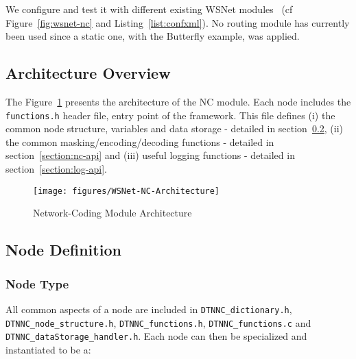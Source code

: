 \documentclass[a4paper,twoside]{article}
\begin{document}
We configure and test it with different existing WSNet modules~\cite{BenHamida2007b} (cf Figure~\ref{fig:wsnet-nc} and Listing~\ref{list:confxml}). No routing module has currently been used since a static one, with the Butterfly example, was applied.



\subsection{Architecture Overview}

The Figure~\ref{fig:wsnet-nc-architecture} presents the architecture of the NC module. Each node includes the \texttt{functions.h} header file, entry point of the framework. This file defines (i) the common node structure, variables and data storage - detailed in section~\ref{section:node}, (ii) the common masking/encoding/decoding functions - detailed in section~\ref{section:nc-api} and (iii) useful logging functions - detailed in section~\ref{section:log-api}.

\begin{figure}[!hbt]
\centering
\texttt{[image: figures/WSNet-NC-Architecture]}
\caption{Network-Coding Module Architecture}
\label{fig:wsnet-nc-architecture}
\end{figure}

\subsection{Node Definition}
\label{section:node}

\subsubsection{Node Type}

All common aspects of a node are included in \texttt{DTNNC\_dictionary.h}, \texttt{DTNNC\_node\_structure.h}, \texttt{DTNNC\_functions.h}, \texttt{DTNNC\_functions.c} and \texttt{DTNNC\_dataStorage\_handler.h}. Each node can then be specialized and instantiated to be a:
\end{document}

